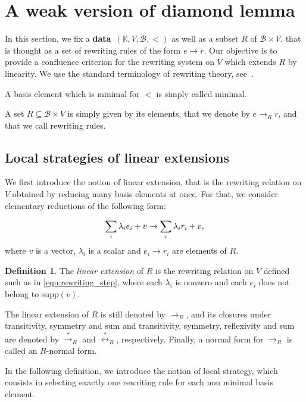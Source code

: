 \documentclass[10pt]{easychair}
\theoremstyle{definition}
\newtheorem{definition}[theorem]{Definition}
\newcommand\data{{\color{red}\bf data}}
\newcommand\supp{\text{supp}}
\newcommand\basis{\mathscr{B}}
\newcommand\K{\mathbb{K}}
\newcommand\rewR{\to_R}
\newcommand\transR{\overset{*}{\to}_R}
\newcommand\equivR{\overset{*}{\leftrightarrow}_R}
\begin{document}
\section{A weak version of diamond lemma}
\label{sec:a_weak_version_of_diamond_lemma}

In this section, we fix a \data\ $(\K,V,\basis,<)$ as well as a subset
$R$ of $\basis\times V$, that is thought as a set of rewriting rules of
the form $e\to r$. Our objective is to provide a confluence criterion for
the rewriting system on $V$ which extends $R$ by linearity. We use the
standard terminology of rewriting theory, see~\cite{MR1629216}.

A basis element which is minimal for $<$ is simply called minimal. 

 A set $R\subseteq\basis\times V$ is simply given
by its elements, that we denote by $e\rewR r$, and that we call rewriting
rules.

\subsection{Local strategies of linear extensions}
\label{sec:local_strategies_of_linear_extensions}

We first introduce the notion of linear extension, that is the rewriting
relation on $V$ obtained by reducing many basis elements at once. For
that, we consider elementary reductions of the following form:

\begin{equation}\label{equ:rewriting_step}
  \sum_i\lambda_ie_i+v\to\sum_i\lambda_ir_i+v,
  \smallskip
\end{equation}
where $v$ is a vector, $\lambda_i$ is a scalar and $e_i\to r_i$ are
elements of $R$.

\begin{definition}\label{def:extensions}
  The {\em linear extension} of $R$ is the rewriting relation on $V$
  defined such as in \eqref{equ:rewriting_step}, where each $\lambda_i$
  is nonzero and each $e_i$ does not belong to $\supp(v)$. 
\end{definition}
\smallskip

The linear extension of $R$ is still denoted by $\rewR$, and its closures
under transitivity, symmetry and sum and transitivity, symmetry,
reflexivity and sum are denoted by $\transR$ and $\equivR$, respectively.
Finally, a normal form for $\rewR$ is called an $R$-normal form.
\medskip

In the following definition, we introduce the notion of local strategy,
which consists in selecting exactly one rewriting rule for each non
minimal basis element.
\end{document}
